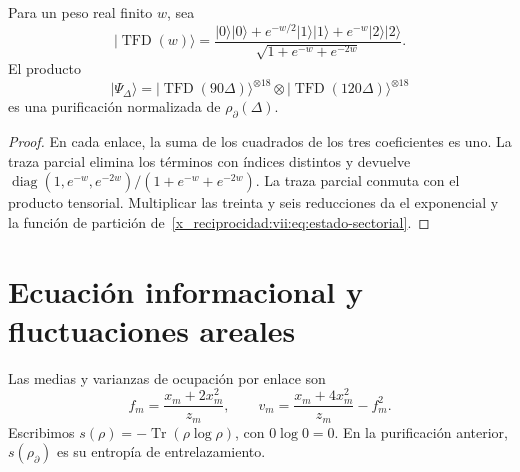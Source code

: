 \begin{proposition}
\label{x_reciprocidad:vii:prop:purificacion-sectorial}
Para un peso real finito \(w\), sea
\begin{equation}
 |\operatorname{TFD}(w)\rangle
 =\frac{|0\rangle|0\rangle+e^{-w/2}|1\rangle|1\rangle
                   +e^{-w}|2\rangle|2\rangle}
        {\sqrt{1+e^{-w}+e^{-2w}}}.
 \label{x_reciprocidad:vii:eq:tfd-local}
\end{equation}
El producto
\begin{equation}
 |\Psi_\Delta\rangle
 =|\operatorname{TFD}(90\Delta)\rangle^{\otimes18}
  \otimes|\operatorname{TFD}(120\Delta)\rangle^{\otimes18}
 \label{x_reciprocidad:vii:eq:tfd-sectorial}
\end{equation}
es una purificación normalizada de \(\rho_\partial(\Delta)\).
\end{proposition}
\begin{proof}
En cada enlace, la suma de los cuadrados de los tres coeficientes es uno.
La traza parcial elimina los términos con índices distintos y devuelve
\(\operatorname{diag}(1,e^{-w},e^{-2w})/(1+e^{-w}+e^{-2w})\).
La traza parcial conmuta con el producto tensorial. Multiplicar las
treinta y seis reducciones da el exponencial y la función de partición
de~\eqref{x_reciprocidad:vii:eq:estado-sectorial}.
\end{proof}

\section{Ecuación informacional y fluctuaciones areales}
\label{x_reciprocidad:vii:subsec:ecuacion-informacional}

Las medias y varianzas de ocupación por enlace son
\begin{equation}
 f_m=\frac{x_m+2x_m^2}{z_m},\qquad
 v_m=\frac{x_m+4x_m^2}{z_m}-f_m^2.
 \label{x_reciprocidad:vii:eq:momentos-sectoriales}
\end{equation}
Escribimos \(s(\rho)=-\operatorname{Tr}(\rho\log\rho)\), con
\(0\log0=0\). En la purificación anterior, \(s(\rho_\partial)\)
es su entropía de entrelazamiento.


